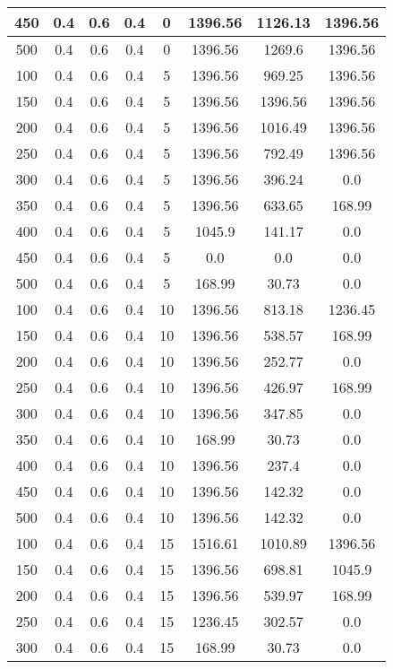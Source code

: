 \documentclass[a4paper, 12pt]{extreport}
\begin{document}
\begin{itemize}
\begin{longtable}{|c|c|c|c|c|c|c|c|}
			450 & 0.4 & 0.6 & 0.4 & 0 & 1396.56 & 1126.13 & 1396.56 \\\hline
			500 & 0.4 & 0.6 & 0.4 & 0 & 1396.56 & 1269.6 & 1396.56 \\\hline
			100 & 0.4 & 0.6 & 0.4 & 5 & 1396.56 & 969.25 & 1396.56 \\\hline
			150 & 0.4 & 0.6 & 0.4 & 5 & 1396.56 & 1396.56 & 1396.56 \\\hline
			200 & 0.4 & 0.6 & 0.4 & 5 & 1396.56 & 1016.49 & 1396.56 \\\hline
			250 & 0.4 & 0.6 & 0.4 & 5 & 1396.56 & 792.49 & 1396.56 \\\hline
			300 & 0.4 & 0.6 & 0.4 & 5 & 1396.56 & 396.24 & 0.0 \\\hline
			350 & 0.4 & 0.6 & 0.4 & 5 & 1396.56 & 633.65 & 168.99 \\\hline
			400 & 0.4 & 0.6 & 0.4 & 5 & 1045.9 & 141.17 & 0.0 \\\hline
			450 & 0.4 & 0.6 & 0.4 & 5 & 0.0 & 0.0 & 0.0 \\\hline
			500 & 0.4 & 0.6 & 0.4 & 5 & 168.99 & 30.73 & 0.0 \\\hline
			100 & 0.4 & 0.6 & 0.4 & 10 & 1396.56 & 813.18 & 1236.45 \\\hline
			150 & 0.4 & 0.6 & 0.4 & 10 & 1396.56 & 538.57 & 168.99 \\\hline
			200 & 0.4 & 0.6 & 0.4 & 10 & 1396.56 & 252.77 & 0.0 \\\hline
			250 & 0.4 & 0.6 & 0.4 & 10 & 1396.56 & 426.97 & 168.99 \\\hline
			300 & 0.4 & 0.6 & 0.4 & 10 & 1396.56 & 347.85 & 0.0 \\\hline
			350 & 0.4 & 0.6 & 0.4 & 10 & 168.99 & 30.73 & 0.0 \\\hline
			400 & 0.4 & 0.6 & 0.4 & 10 & 1396.56 & 237.4 & 0.0 \\\hline
			450 & 0.4 & 0.6 & 0.4 & 10 & 1396.56 & 142.32 & 0.0 \\\hline
			500 & 0.4 & 0.6 & 0.4 & 10 & 1396.56 & 142.32 & 0.0 \\\hline
			100 & 0.4 & 0.6 & 0.4 & 15 & 1516.61 & 1010.89 & 1396.56 \\\hline
			150 & 0.4 & 0.6 & 0.4 & 15 & 1396.56 & 698.81 & 1045.9 \\\hline
			200 & 0.4 & 0.6 & 0.4 & 15 & 1396.56 & 539.97 & 168.99 \\\hline
			250 & 0.4 & 0.6 & 0.4 & 15 & 1236.45 & 302.57 & 0.0 \\\hline
			300 & 0.4 & 0.6 & 0.4 & 15 & 168.99 & 30.73 & 0.0 \\\hline

\end{longtable}
\end{itemize}
\end{document}
